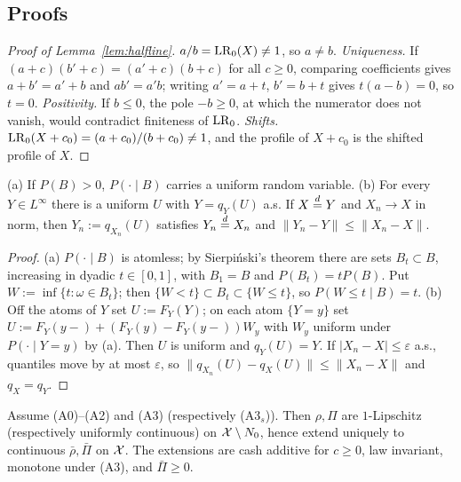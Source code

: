 \subsection{Proofs}\label{app:C}


\begin{proof}[Proof of Lemma~\ref{lem:halfline}]
$a/b=\mathrm{LR}_0(X)\ne1$, so $a\ne b$. \emph{Uniqueness.} If $(a+c)(b'+c)=(a'+c)(b+c)$ for all $c\ge0$, comparing
coefficients gives $a+b'=a'+b$ and $ab'=a'b$; writing $a'=a+t$, $b'=b+t$ gives $t(a-b)=0$, so $t=0$.
\emph{Positivity.} If $b\le0$, the pole $-b\ge0$, at which the numerator does not vanish, would contradict finiteness
of $\mathrm{LR}_0$. \emph{Shifts.} $\mathrm{LR}_0(X+c_0)=(a+c_0)/(b+c_0)\ne1$, and the profile of $X+c_0$ is the shifted profile of $X$. \qedhere
\end{proof}

\begin{lemma}\label{lem:coupling}
(a) If $P(B)>0$, $P(\cdot\mid B)$ carries a uniform random variable. (b) For every $Y\in L^\infty$ there is a uniform
$U$ with $Y=q_Y(U)$ a.s. If $X\overset{d}{=} Y$ and $X_n\to X$ in norm, then $Y_n:=q_{X_n}(U)$ satisfies $Y_n\overset{d}{=} X_n$ and
$\|Y_n-Y\|\le\|X_n-X\|$.
\end{lemma}

\begin{proof}
(a) $P(\cdot\mid B)$ is atomless; by Sierpi\'nski's theorem there are sets $B_t\subset B$, increasing in dyadic
$t\in[0,1]$, with $B_1=B$ and $P(B_t)=tP(B)$. Put $W:=\inf\{t:\omega\in B_t\}$; then $\{W<t\}\subset B_t\subset\{W\le t\}$,
so $P(W\le t\mid B)=t$. (b) Off the atoms of $Y$ set $U:=F_Y(Y)$; on each atom $\{Y=y\}$ set
$U:=F_Y(y-)+(F_Y(y)-F_Y(y-))W_y$ with $W_y$ uniform under $P(\cdot\mid Y=y)$ by (a). Then $U$ is uniform and
$q_Y(U)=Y$. If $|X_n-X|\le\varepsilon$ a.s., quantiles move by at most $\varepsilon$, so
$\|q_{X_n}(U)-q_X(U)\|\le\|X_n-X\|$ and $q_X=q_Y$. \qedhere
\end{proof}

\begin{lemma}[Extension]\label{lem:ext}
Assume (A0)--(A2) and (A3) (respectively (A3$_s$)). Then $\rho,\Pi$ are $1$-Lipschitz (respectively uniformly
continuous) on $\mathcal X\setminus N_0$, hence extend uniquely to continuous $\bar\rho,\bar\Pi$ on $\mathcal X$. The extensions
are cash additive for $c\ge0$, law invariant, monotone under (A3), and $\bar\Pi\ge0$.
\end{lemma}

